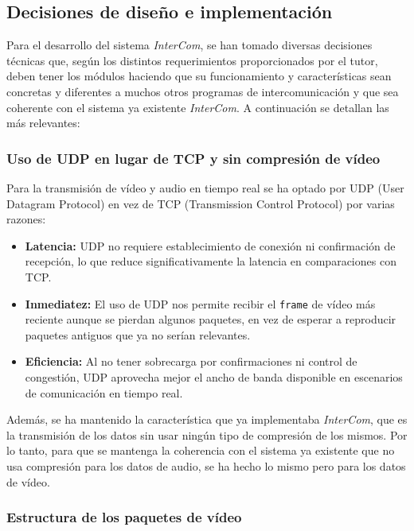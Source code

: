 \newpage

\subsection{Decisiones de diseño e implementación}

Para el desarrollo del sistema \textit{InterCom}, se han tomado diversas decisiones técnicas que, según los distintos requerimientos proporcionados por el tutor, deben tener los módulos haciendo que su funcionamiento y características sean concretas y diferentes a muchos otros programas de intercomunicación y que sea coherente con el sistema ya existente \textit{InterCom}. A continuación se detallan las más relevantes:

\subsubsection{Uso de UDP en lugar de TCP y sin compresión de vídeo}

Para la transmisión de vídeo y audio en tiempo real se ha optado por UDP (User Datagram Protocol) en vez de TCP (Transmission Control Protocol) por varias razones:

\begin{itemize} 
    \item \textbf{Latencia:} UDP no requiere establecimiento de conexión ni confirmación de recepción, lo que reduce significativamente la latencia en comparaciones con TCP. \cite{lpi}
    \item \textbf{Inmediatez:} El uso de UDP nos permite recibir el \texttt{frame} de vídeo más reciente aunque se pierdan algunos paquetes, en vez de esperar a reproducir paquetes antiguos que ya no serían relevantes. \cite{rfc768}
    \item \textbf{Eficiencia:} Al no tener sobrecarga por confirmaciones ni control de congestión, UDP aprovecha mejor el ancho de banda disponible en escenarios de comunicación en tiempo real. \cite{cloudflare_udp}
\end{itemize}

Además, se ha mantenido la característica que ya implementaba \textit{InterCom}, que es la transmisión de los datos sin usar ningún tipo de compresión de los mismos. Por lo tanto, para que se mantenga la coherencia con el sistema ya existente que no usa compresión para los datos de audio, se ha hecho lo mismo pero para los datos de vídeo.

\subsubsection{Estructura de los paquetes de vídeo}

